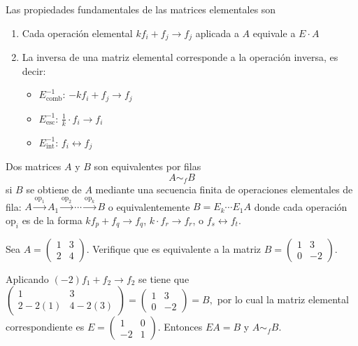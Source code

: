 \begin{theorem} Las propiedades fundamentales de las matrices elementales son
\begin{enumerate}

\item Cada operación elemental $k f_i + f_j \to f_j$ aplicada a $A$ equivale a $E \cdot A$
\item La inversa de una matriz elemental corresponde a la operación inversa, es decir:
  \begin{itemize}
  \item $E_{\text{comb}}^{-1}$: $-k f_i + f_j \to f_j$
  \item $E_{\text{esc}}^{-1}$: $\frac{1}{k} \cdot f_i \to f_i$
  \item $E_{\text{int}}^{-1}$: $f_i \leftrightarrow f_j$
  \end{itemize}
\end{enumerate}
\end{theorem}

\begin{definition}
Dos matrices $A$ y $B$ son equivalentes por filas $$A \sim_f B$$ si $B$ se obtiene de $A$ mediante una secuencia finita de operaciones elementales de fila:
\(A \xrightarrow{\text{op}_1} A_1 \xrightarrow{\text{op}_2} \cdots \xrightarrow{\text{op}_k} B \)  o equivalentemente \( B = E_k \cdots E_1 A
\)
donde cada  operación $\text{op}_i$ es de la forma $k f_p + f_q \to f_q$, $k \cdot f_r \to f_r$, o $f_s \leftrightarrow f_t$.
\end{definition}

\begin{example}\label{ex:equiv}
Sea $A = \begin{pmatrix} 1 & 3 \\ 2 & 4 \end{pmatrix}$. Verifique que es equivalente a la matriz $B = \begin{pmatrix} 1 & 3 \\ 0 & -2 \end{pmatrix}$.
\begin{myproof}
Aplicando $(-2)f_1 + f_2 \to f_2$ se tiene que $\begin{pmatrix} 1 & 3 \\ 2-2(1) & 4-2(3) \end{pmatrix} = \begin{pmatrix} 1 & 3 \\ 0 & -2 \end{pmatrix} = B,$ por lo cual la matriz elemental correspondiente es $E = \begin{pmatrix} 1 & 0 \\ -2 & 1 \end{pmatrix}.$ Entonces $EA = B$ y $A \sim_f B$.
\end{myproof}
\end{example}

